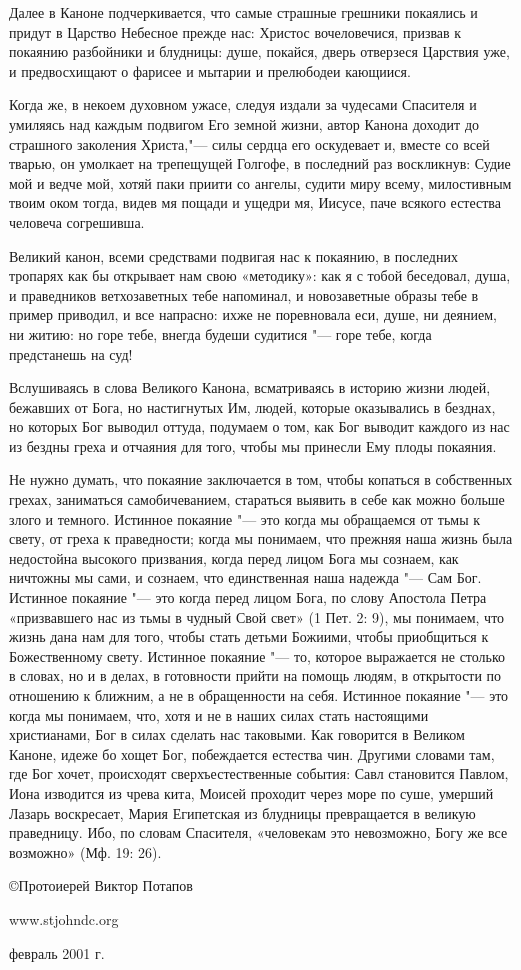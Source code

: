 \begin{mymulticols}
Далее в Каноне подчеркивается, что самые страшные грешники покаялись и придут в Царство Небесное прежде нас: Христос вочеловечися, призвав к покаянию разбойники и блудницы: душе, покайся, дверь отверзеся Царствия уже, и предвосхищают о фарисее и мытарии и прелюбодеи кающиися.

Когда же, в некоем духовном ужасе, следуя издали за чудесами Спасителя и умиляясь над каждым подвигом Его земной жизни, автор Канона доходит до страшного заколения Христа,"--- силы сердца его оскудевает и, вместе со всей тварью, он умолкает на трепещущей Голгофе, в последний раз воскликнув: Судие мой и ведче мой, хотяй паки приити со ангелы, судити миру всему, милостивным твоим оком тогда, видев мя пощади и ущедри мя, Иисусе, паче всякого естества человеча согрешивша.

Великий канон, всеми средствами подвигая нас к покаянию, в последних тропарях как бы открывает нам свою «методику»: как я с тобой беседовал, душа, и праведников ветхозаветных тебе напоминал, и новозаветные образы тебе в пример приводил, и все напрасно: ихже не поревновала еси, душе, ни деянием, ни житию: но горе тебе, внегда будеши судитися "--- горе тебе, когда предстанешь на суд!

Вслушиваясь в слова Великого Канона, всматриваясь в историю жизни людей, бежавших от Бога, но настигнутых Им, людей, которые оказывались в безднах, но которых Бог выводил оттуда, подумаем о том, как Бог выводит каждого из нас из бездны греха и отчаяния для того, чтобы мы принесли Ему плоды покаяния.

Не нужно думать, что покаяние заключается в том, чтобы копаться в собственных грехах, заниматься самобичеванием, стараться выявить в себе как можно больше злого и темного. Истинное покаяние "--- это когда мы обращаемся от тьмы к свету, от греха к праведности; когда мы понимаем, что прежняя наша жизнь была недостойна высокого призвания, когда перед лицом Бога мы сознаем, как ничтожны мы сами, и сознаем, что единственная наша надежда "--- Сам Бог. Истинное покаяние "--- это когда перед лицом Бога, по слову Апостола Петра «призвавшего нас из тьмы в чудный Свой свет» (1 Пет. 2: 9), мы понимаем, что жизнь дана нам для того, чтобы стать детьми Божиими, чтобы приобщиться к Божественному свету. Истинное покаяние "--- то, которое выражается не столько в словах, но и в делах, в готовности прийти на помощь людям, в открытости по отношению к ближним, а не в обращенности на себя. Истинное покаяние "--- это когда мы понимаем, что, хотя и не в наших силах стать настоящими христианами, Бог в силах сделать нас таковыми. Как говорится в Великом Каноне, идеже бо хощет Бог, побеждается естества чин. Другими словами там, где Бог хочет, происходят сверхъестественные события: Савл становится Павлом, Иона изводится из чрева кита, Моисей проходит через море по суше, умерший Лазарь воскресает, Мария Египетская из блудницы превращается в великую праведницу. Ибо, по словам Спасителя, «человекам это невозможно, Богу же все возможно» (Мф. 19: 26).

©Протоиерей Виктор Потапов

www.stjohndc.org

февраль 2001 г.

\end{mymulticols}

